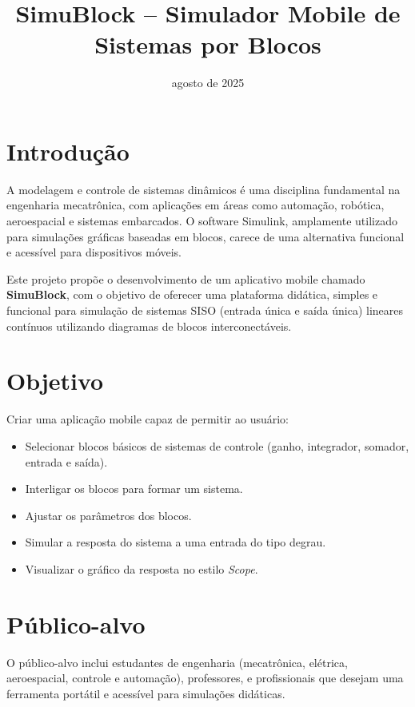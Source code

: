 \documentclass[12pt]{article}
\title{SimuBlock -- Simulador Mobile de Sistemas por Blocos}
\date{agosto de 2025}
\begin{document}
\maketitle

\section*{Introdução}

A modelagem e controle de sistemas dinâmicos é uma disciplina fundamental na engenharia mecatrônica, com aplicações em áreas como automação, robótica, aeroespacial e sistemas embarcados. O software Simulink, amplamente utilizado para simulações gráficas baseadas em blocos, carece de uma alternativa funcional e acessível para dispositivos móveis.

Este projeto propõe o desenvolvimento de um aplicativo mobile chamado \textbf{SimuBlock}, com o objetivo de oferecer uma plataforma didática, simples e funcional para simulação de sistemas SISO (entrada única e saída única) lineares contínuos utilizando diagramas de blocos interconectáveis. 

\section*{Objetivo}

Criar uma aplicação mobile capaz de permitir ao usuário:
\begin{itemize}
    \item Selecionar blocos básicos de sistemas de controle (ganho, integrador, somador, entrada e saída).
    \item Interligar os blocos para formar um sistema.
    \item Ajustar os parâmetros dos blocos.
    \item Simular a resposta do sistema a uma entrada do tipo degrau.
    \item Visualizar o gráfico da resposta no estilo \textit{Scope}.
\end{itemize}

\section*{Público-alvo}

O público-alvo inclui estudantes de engenharia (mecatrônica, elétrica, aeroespacial, controle e automação), professores, e profissionais que desejam uma ferramenta portátil e acessível para simulações didáticas.
\end{document}
